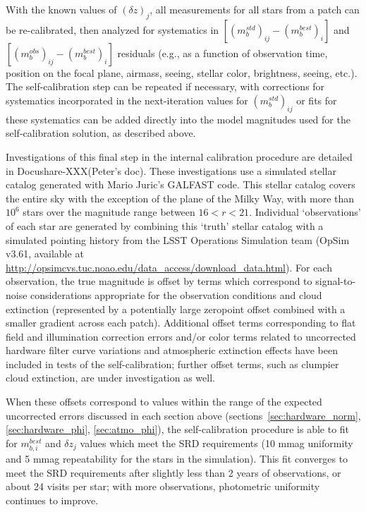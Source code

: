 \documentclass[12pt,preprint]{aastex}
\begin{document}
With the known values of $(\delta z)_j$, all measurements for all stars from a
patch can be re-calibrated, then analyzed for systematics in
$[(m_b^{std})_{ij} - (m_b^{best})_{i}]$ and $[(m_b^{obs})_{ij} -
(m_b^{best})_{i}]$ residuals (e.g., as a function of observation time,
position on the focal plane, airmass, seeing, stellar color,
brightness, seeing, etc.). The self-calibration step can be repeated
if necessary, with corrections for systematics incorporated in the
next-iteration values for $(m_b^{std})_{ij}$ or fits for these
systematics can be added directly into
the model magnitudes used for the self-calibration solution, as
described above.

Investigations of this final step in the internal calibration procedure are
detailed in Docushare-XXX(Peter's doc). These investigations use a
simulated stellar catalog generated with Mario Juric's GALFAST
code. This stellar catalog covers the entire sky with the exception of
the plane of the Milky Way, with more than $10^6$ stars over the
magnitude range between $16<r<21$.  Individual `observations' of each
star are generated by combining this `truth' stellar catalog with a
simulated pointing history from the LSST Operations Simulation team
(OpSim v3.61, available at
\url{http://opsimcvs.tuc.noao.edu/data_access/download_data.html}). For
each observation, the true magnitude is offset by terms which
correspond to signal-to-noise considerations appropriate for the
observation conditions and cloud extinction (represented by a
potentially large zeropoint offset combined with a smaller gradient
across each patch). Additional offset terms corresponding to flat
field and illumination correction errors and/or color terms related to
uncorrected hardware filter curve variations and atmospheric
extinction effects have been included in tests of the self-calibration;
further offset terms, such as clumpier cloud extinction, are under
investigation as well.

When these offsets correspond to values within the range of the
expected uncorrected errors discussed in each section above
(sections~\ref{sec:hardware_norm}, \ref{sec:hardware_phi},
\ref{sec:atmo_phi}), the self-calibration procedure is able to fit for
$m_{b,i}^{best}$ and $\delta z_j$ values which meet the SRD
requirements (10 mmag uniformity and 5 mmag repeatability for the
stars in the simulation).  This fit converges to meet the SRD
requirements after slightly less than 2 years of observations, or
about 24 visits per star; with more observations, photometric
uniformity continues to improve.
\end{document}
